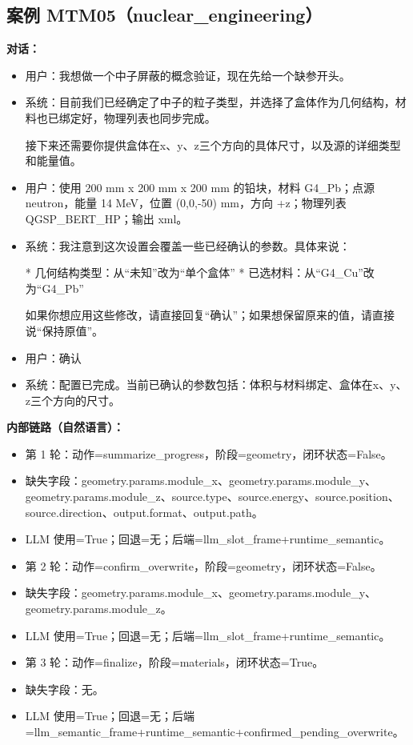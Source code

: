 \documentclass[11pt]{ctexart}
\begin{document}
\subsection{案例 MTM05（nuclear\_engineering）}
\textbf{对话：}
\begin{itemize}
\item 用户：我想做一个中子屏蔽的概念验证，现在先给一个缺参开头。
\item 系统：目前我们已经确定了中子的粒子类型，并选择了盒体作为几何结构，材料也已绑定好，物理列表也同步完成。

接下来还需要你提供盒体在x、y、z三个方向的具体尺寸，以及源的详细类型和能量值。
\item 用户：使用 200 mm x 200 mm x 200 mm 的铅块，材料 G4\_Pb；点源 neutron，能量 14 MeV，位置 (0,0,-50) mm，方向 +z；物理列表 QGSP\_BERT\_HP；输出 xml。
\item 系统：我注意到这次设置会覆盖一些已经确认的参数。具体来说：

*   几何结构类型：从“未知”改为“单个盒体”
*   已选材料：从“G4\_Cu”改为“G4\_Pb”

如果你想应用这些修改，请直接回复“确认”；如果想保留原来的值，请直接说“保持原值”。
\item 用户：确认
\item 系统：配置已完成。当前已确认的参数包括：体积与材料绑定、盒体在x、y、z三个方向的尺寸。
\end{itemize}
\textbf{内部链路（自然语言）：}
\begin{itemize}
\item 第 1 轮：动作=summarize\_progress，阶段=geometry，闭环状态=False。
\item 缺失字段：geometry.params.module\_x、geometry.params.module\_y、geometry.params.module\_z、source.type、source.energy、source.position、source.direction、output.format、output.path。
\item LLM 使用=True；回退=无；后端=llm\_slot\_frame+runtime\_semantic。
\item 第 2 轮：动作=confirm\_overwrite，阶段=geometry，闭环状态=False。
\item 缺失字段：geometry.params.module\_x、geometry.params.module\_y、geometry.params.module\_z。
\item LLM 使用=True；回退=无；后端=llm\_slot\_frame+runtime\_semantic。
\item 第 3 轮：动作=finalize，阶段=materials，闭环状态=True。
\item 缺失字段：无。
\item LLM 使用=True；回退=无；后端=llm\_semantic\_frame+runtime\_semantic+confirmed\_pending\_overwrite。
\end{itemize}
\end{document}
